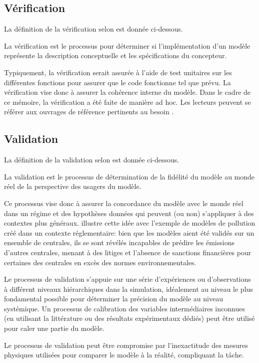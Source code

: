     \subsection{Vérification}
        La définition de la vérification selon \textcite{national_research_council_assessing_2012} est donnée ci-dessous.
        \begin{definition}
            La vérification est le processus pour déterminer si l'implémentation d'un modèle représente la description conceptuelle et les spécifications du concepteur.
        \end{definition}
        Typiquement, la vérification serait assurée à l'aide de test unitaires sur les différentes fonctions pour assurer que le code fonctionne tel que prévu. La vérification vise donc à assurer la cohérence interne du modèle. Dans le cadre de ce mémoire, la vérification a été faite de manière ad hoc. Les lecteurs peuvent se référer aux ouvrages de référence pertinents au besoin \parencite{sale_testing_2014,saleh_javascript_2013}.\par
    
    \subsection{Validation}
        La définition de la validation selon \textcite{national_research_council_assessing_2012} est donnée ci-dessous.
        \begin{definition}
            La validation est le processus de détermination de la fidélité du modèle au monde réel de la perspective des usagers du modèle.
        \end{definition}
        Ce processus vise donc à assurer la concordance du modèle avec le monde réel dans un régime et des hypothèses données qui peuvent (ou non) s'appliquer à des contextes plus généraux. \textcite{oreskes_evaluation_1998} illustre cette idée avec l'exemple de modèles de pollution créé dans un contexte réglementaire: bien que les modèles aient été validés sur un ensemble de centrales, ils se sont révélés incapables de prédire les émissions d'autres centrales, menant à des litiges et l'absence de sanctions financières pour certaines des centrales en excès des normes environnementales.\par
        Le processus de validation s'appuie sur une série d'expériences ou d'observations à différent niveaux hiérarchiques dans la simulation, idéalement au niveau le plus fondamental possible pour déterminer la précision du modèle au niveau systémique. Un processus de calibration des variables intermédiaires inconnues (en utilisant la littérature ou des résultats expérimentaux dédiés) peut être utilisé pour caler une partie du modèle. \par
        Le processus de validation peut être compromise par l’inexactitude des mesures physiques utilisées pour comparer le modèle à la réalité, compliquant la tâche.\par
